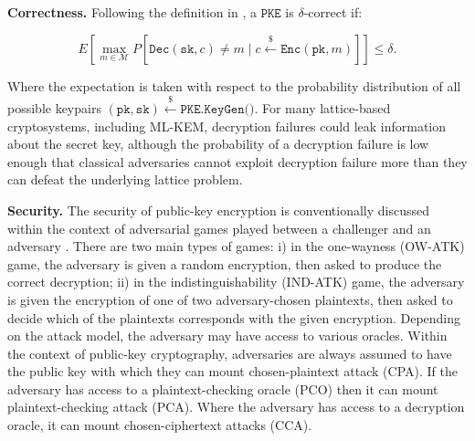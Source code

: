 \documentclass[runningheads]{llncs}
\newcommand{\pke}{\texttt{PKE}}
\newcommand{\encrypt}{\texttt{Enc}}
\newcommand{\decrypt}{\texttt{Dec}}
\newcommand{\pk}{\texttt{pk}}
\newcommand{\sk}{\texttt{sk}}
\newcommand{\leftsample}{\stackrel{\$}{\leftarrow}}
\begin{document}
\textbf{Correctness.} Following the definition in \cite{DBLP:conf/eurocrypt/DworkNR04}, a $\pke$ is $\delta$-correct if:

\begin{equation*}
    E\left[\max_{m \in \mathcal{M}} P\left[\decrypt(\sk, c) \neq m \mid c \leftsample \encrypt(\pk, m)\right]\right] \leq \delta.
\end{equation*}

Where the expectation is taken with respect to the probability distribution of all possible keypairs $(\pk, \sk) \leftsample \texttt{PKE.KeyGen()}$. For many lattice-based cryptosystems, including ML-KEM, decryption failures could leak information about the secret key, although the probability of a decryption failure is low enough that classical adversaries cannot exploit decryption failure more than they can defeat the underlying lattice problem.

\textbf{Security.} The security of public-key encryption is conventionally discussed within the context of adversarial games played between a challenger and an adversary \cite{DBLP:conf/stoc/GoldwasserM82}. There are two main types of games: i) in the one-wayness (OW-ATK) game, the adversary is given a random encryption, then asked to produce the correct decryption; ii) in the indistinguishability (IND-ATK) game, the adversary is given the encryption of one of two adversary-chosen plaintexts, then asked to decide which of the plaintexts corresponds with the given encryption. Depending on the attack model, the adversary may have access to various oracles. Within the context of public-key cryptography, adversaries are always assumed to have the public key with which they can mount chosen-plaintext attack (CPA). If the adversary has access to a plaintext-checking oracle (PCO) \cite{DBLP:conf/ctrsa/OkamotoP01} then it can mount plaintext-checking attack (PCA). Where the adversary has access to a decryption oracle, it can mount chosen-ciphertext attacks (CCA). 
\end{document}

